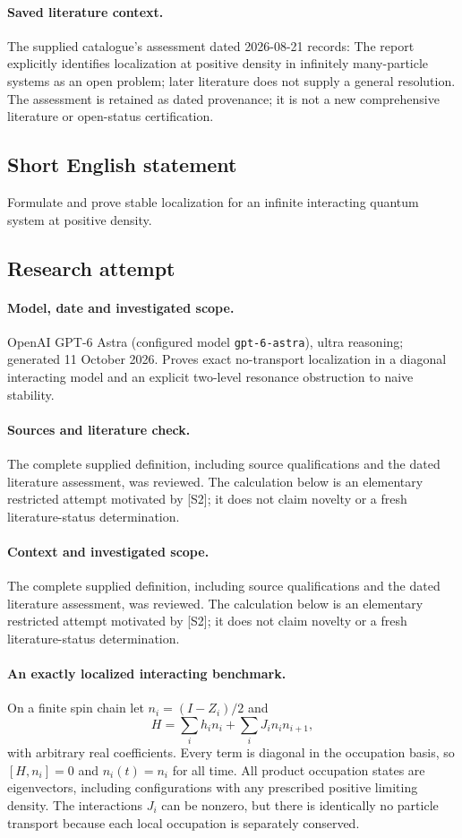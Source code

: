 \documentclass[11pt]{article}
\begin{document}
\paragraph{Saved literature context.} The supplied catalogue's assessment dated 2026-08-21 records: The report explicitly identifies localization at positive density in infinitely many-particle systems as an open problem; later literature does not supply a general resolution. The assessment is retained as dated provenance; it is not a new comprehensive literature or open-status certification.
\subsection{Short English statement}
Formulate and prove stable localization for an infinite interacting quantum system at positive density.
\subsection{Research attempt}
\paragraph{Model, date and investigated scope.}
OpenAI GPT-6 Astra (configured model \texttt{gpt-6-astra}), ultra reasoning; generated 11 October 2026. Proves exact no-transport localization in a diagonal interacting model and an explicit two-level resonance obstruction to naive stability.

\paragraph{Sources and literature check.}
The complete supplied definition, including source qualifications and the dated literature assessment, was reviewed. The calculation below is an elementary restricted attempt motivated by [S2]; it does not claim novelty or a fresh literature-status determination.

\paragraph{Context and investigated scope.} The complete supplied definition, including source qualifications and the dated literature assessment, was reviewed. The calculation below is an elementary restricted attempt motivated by [S2]; it does not claim novelty or a fresh literature-status determination.

\paragraph{An exactly localized interacting benchmark.} On a finite spin chain let $n_i=(I-Z_i)/2$ and
\[
 H=\sum_i h_i n_i+\sum_iJ_i n_in_{i+1},
\]
with arbitrary real coefficients. Every term is diagonal in the occupation basis, so $[H,n_i]=0$ and $n_i(t)=n_i$ for all time. All product occupation states are eigenvectors, including configurations with any prescribed positive limiting density. The interactions $J_i$ can be nonzero, but there is identically no particle transport because each local occupation is separately conserved.
\end{document}
